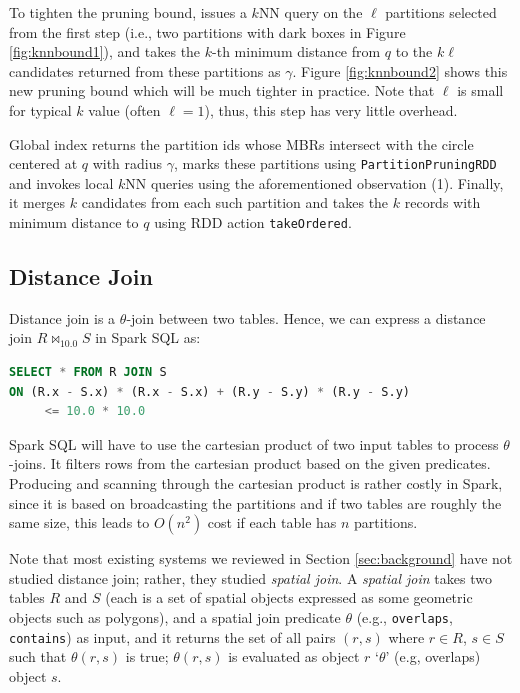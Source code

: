 To tighten the pruning bound, \name issues a $k$NN query on the $\ell$
partitions selected from the first step (i.e., two partitions with
dark boxes in Figure \ref{fig:knnbound1}), and takes the $k$-th
minimum distance from $q$ to the $k\ell$ candidates returned from
these partitions as $\gamma$.  Figure \ref{fig:knnbound2} shows this
new pruning bound which will be much tighter in practice. Note that
$\ell$ is small for typical $k$ value (often $\ell=1$), thus, this
step has very little overhead.

Global index returns the partition ids whose MBRs intersect with the
circle centered at $q$ with radius $\gamma$, \name marks these
partitions using \texttt{PartitionPruningRDD} and invokes local $k$NN
queries using the aforementioned observation (1). Finally, it merges
$k$ candidates from each such partition and takes the $k$ records with
minimum distance to $q$ using RDD action \texttt{takeOrdered}.

\subsection{Distance Join}
\label{sub:disjoin}
Distance join is a $\theta$-join between two tables. Hence, we can
express a distance join $R \Join_{10.0} S$ in Spark SQL as:
\begin{lstlisting}[language=SQL]
SELECT * FROM R JOIN S
ON (R.x - S.x) * (R.x - S.x) + (R.y - S.y) * (R.y - S.y)
     <= 10.0 * 10.0
\end{lstlisting}\vspace{-2mm}

Spark SQL will have to use the cartesian product of two input tables
to process $\theta$-joins.  It filters rows from the cartesian product
based on the given predicates. Producing and scanning through
the cartesian product is rather costly in Spark, since it is based on
broadcasting the partitions and if two tables are roughly the same
size, this leads to $O(n^2)$ cost if each table has $n$ partitions.

Note that most existing systems we reviewed in Section
\ref{sec:background} have not studied distance join; rather, they
studied {\em spatial join}. A {\em spatial join} takes two tables $R$
and $S$ (each is a set of spatial objects expressed as some geometric
objects such as polygons), and a spatial join predicate $\theta$
(e.g., \texttt{overlaps}, \texttt{contains}) as input, and it returns
the set of all pairs $(r, s)$ where $r \in R$, $s \in S$ such that
$\theta(r, s)$ is true; $\theta(r,s)$ is evaluated as object $r$
`$\theta$' (e.g, overlaps) object $s$.  

